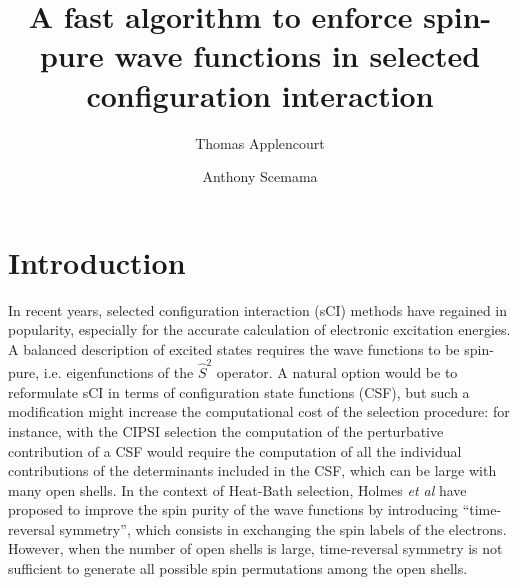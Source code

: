 \documentclass[aip,jcp,reprint,showkeys]{revtex4-1}
\newcommand{\stwo}{\hat{S}^2}
\begin{document}
\title{A fast algorithm to enforce spin-pure wave functions in selected configuration interaction}

\author{Thomas Applencourt}
\author{Anthony Scemama}

\begin{abstract}
\end{abstract}


\maketitle

\section{Introduction}

In recent years, selected configuration interaction (sCI) methods have regained in
popularity,\cite{Greer_1998,Stampfuss_2005,Bytautas_2009,Booth_2009,Giner_2013,Buenker_2014,Holmes_2016,Ohtsuka_2017,Coe_2018}
especially for the accurate calculation of electronic excitation
energies.\cite{Coe_2013,Schriber_2017,Holmes_2017,Loos_2018,Scemama_2018,Dash_2018}
A balanced description of excited states requires the wave functions to be
spin-pure, i.e. eigenfunctions of the $\stwo$ operator.
A natural option would be to reformulate sCI in terms of configuration state
functions (CSF), but such a modification might increase the computational cost
of the selection procedure: for instance, with the CIPSI
selection\cite{Bender_1969,Whitten_1969,Huron_1973} the computation of the
perturbative contribution of a CSF would require the computation of all the
individual contributions of the determinants included in the CSF, which can
be large with many open shells.
In the context of Heat-Bath selection, Holmes \textit{et al} have proposed to
improve the spin purity of the wave functions by introducing ``time-reversal
symmetry''\cite{Holmes_2017}, which consists in exchanging the spin labels of
the electrons.
However, when the number of open shells is large, time-reversal symmetry is not
sufficient to generate all possible spin permutations among the open shells.
\end{document}
